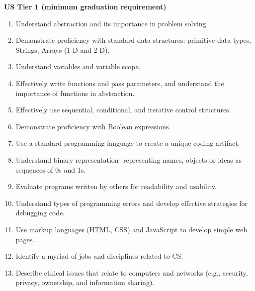 \textbf{US Tier 1 (minimum graduation requirement)}
\begin{enumerate}
	\item Understand abstraction and its importance in problem solving.
	\item Demonstrate proficiency with standard data structures: primitive data types, Strings, Arrays (1-D and 2-D).
	\item Understand variables and variable scope.
	\item Effectively write functions and pass parameters, and understand the importance of functions in abstraction.
	\item Effectively use sequential, conditional, and iterative control structures.
	\item Demonstrate proficiency with Boolean expressions.
	\item Use a standard programming language to create a unique coding artifact.
	\item Understand binary representation- representing names, objects or ideas as sequences of 0s and 1s.
	\item Evaluate programs written by others for readability and usability.
	\item Understand types of programming errors and develop effective strategies for debugging code.
	\item Use markup languages (HTML, CSS) and JavaScript to develop simple web pages.
	\item Identify a myriad of jobs and disciplines related to CS.
	\item Describe ethical issues that relate to computers and networks (e.g., security, privacy, ownership, and information sharing).
\end{enumerate}

